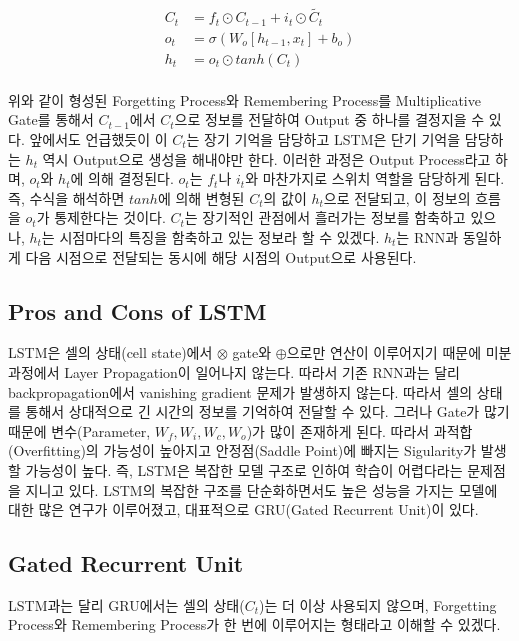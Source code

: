 \documentclass[draft=false]{oblivoir}
\begin{document}
\begin{equation}
	\begin{split}
		C_t & = f_t \odot C_{t-1} + i_{t} \odot \tilde{C_{t}}\\
        o_t & = \sigma(W_{o}[h_{t-1}, x_t] + b_o)\\
        h_t & = o_t \odot tanh(C_t)\\
	\end{split}
	\label{eq:16-11}
\end{equation}

위와 같이 형성된 Forgetting Process와 Remembering Process를 Multiplicative Gate를 통해서 $C_{t-1}$에서 $C_t$으로 정보를 전달하여 Output 중 하나를 결정지을 수 있다. 앞에서도 언급했듯이 이 $C_t$는 장기 기억을 담당하고 LSTM은 단기 기억을 담당하는 $h_t$ 역시 Output으로 생성을 해내야만 한다. 이러한 과정은 Output Process라고 하며, $o_t$와 $h_t$에 의해 결정된다. $o_t$는 $f_t$나 $i_t$와 마찬가지로 스위치 역할을 담당하게 된다. 즉, 수식을 해석하면 $tanh$에 의해 변형된 $C_t$의 값이 $h_t$으로 전달되고, 이 정보의 흐름을 $o_t$가 통제한다는 것이다. $C_t$는 장기적인 관점에서 흘러가는 정보를 함축하고 있으나, $h_t$는 시점마다의 특징을 함축하고 있는 정보라 할 수 있겠다. $h_t$는 RNN과 동일하게 다음 시점으로 전달되는 동시에 해당 시점의 Output으로 사용된다.

\subsection{Pros and Cons of LSTM}
LSTM은 셀의 상태(cell state)에서 $\otimes$ gate와 $\oplus$으로만 연산이 이루어지기 때문에 미분 과정에서 Layer Propagation이 일어나지 않는다. 따라서 기존  RNN과는 달리 backpropagation에서 vanishing gradient 문제가 발생하지 않는다. 따라서 셀의 상태를 통해서 상대적으로 긴 시간의 정보를 기억하여 전달할 수 있다. 그러나 Gate가 많기 때문에 변수(Parameter, $W_f, W_i, W_c, W_o$)가 많이 존재하게 된다. 따라서 과적합(Overfitting)의 가능성이 높아지고 안정점(Saddle Point)에 빠지는 Sigularity가 발생할 가능성이 높다. 즉, LSTM은 복잡한 모델 구조로 인하여 학습이 어렵다라는 문제점을 지니고 있다. LSTM의 복잡한 구조를 단순화하면서도 높은 성능을 가지는 모델에 대한 많은 연구가 이루어졌고, 대표적으로 GRU(Gated Recurrent Unit)이 있다. 

\subsection{Gated Recurrent Unit}
LSTM과는 달리 GRU에서는 셀의 상태($C_t$)는 더 이상 사용되지 않으며, Forgetting Process와 Remembering Process가 한 번에 이루어지는 형태라고 이해할 수 있겠다.
\end{document}
